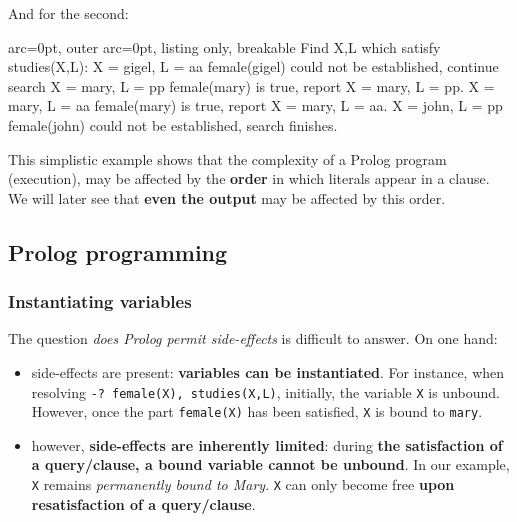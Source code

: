 And for the second:

\begin{tcblisting}{ arc=0pt, outer arc=0pt, listing only, breakable}
Find X,L which satisfy studies(X,L):
  X = gigel, L = aa
    female(gigel) could not be established, continue search
  X = mary, L = pp
    female(mary) is true, report X = mary, L = pp.
  X = mary, L = aa
    female(mary) is true, report X = mary, L = aa.
  X = john, L = pp
    female(john) could not be established, search finishes.

\end{tcblisting}


This simplistic example shows that the complexity of a Prolog program (execution), may be affected by the \textbf{order} in which literals appear in a clause. We will later see that \textbf{even the output} may be affected by this order.

\subsection*{ Prolog programming }

\subsubsection*{ Instantiating variables }

The question \textit{does Prolog permit side-effects} is difficult to answer. On one hand:
\begin{itemize}
	\item  side-effects are present: \textbf{variables can be instantiated}. For instance, when resolving \texttt{-? female(X), studies(X,L)}, initially, the variable \texttt{X} is unbound. However, once the part \texttt{female(X)} has been satisfied, \texttt{X} is bound to \texttt{mary}.
	\item  however, \textbf{side-effects are inherently limited}: during \textbf{the satisfaction of a query/clause, a bound variable cannot be unbound}. In our example, \texttt{X} remains \textit{permanently bound to Mary}. \texttt{X} can only become free \textbf{upon resatisfaction of a query/clause}.
\end{itemize}

